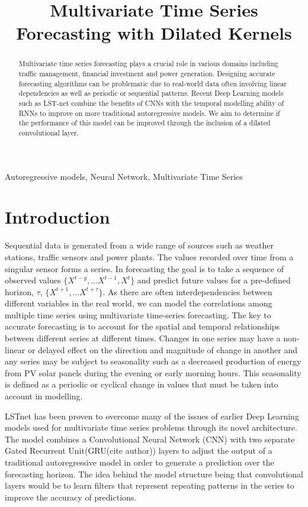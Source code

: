 \documentclass{article}
\title{Multivariate Time Series Forecasting with Dilated Kernels}
\begin{document}
%
\maketitle
%
\begin{abstract}
Multivariate time series forecasting plays a crucial role in various domains including traffic management, financial investment and power generation. Designing accurate forecasting algorithms can be problematic due to real-world data often involving linear dependencies as well as periodic or sequential patterns. Recent Deep Learning models such as LST-net combine the benefits of CNNs with the temporal modelling ability of RNNs to improve on more traditional autoregressive models. We aim to determine if the performance of this model can be improved through the inclusion of a dilated convolutional layer.
\end{abstract}
%
\begin{keywords}
Autoregressive models, Neural Network, Multivariate Time Series
\end{keywords}
%
\section{Introduction}

Sequential data is generated from a wide range of sources such as weather stations, traffic sensors and power plants. The values recorded over time from a singular sensor forms a series. In forecasting the goal is to take a sequence of observed values $\{X^{t-y},...X^{t-1}, X^{t}\}$ and predict future values for a pre-defined horizon, $\tau$,  $\{X^{t+1},...X^{t+\tau}\}$. As there are often interdependencies between different variables in the real world, we can model the correlations among multiple time series using multivariate time-series forecasting. The key to accurate forecasting is to account for the spatial and temporal relationships between different series at different times. Changes in one series may have a non-linear or delayed effect on the direction and magnitude of change in another and any series may be subject to seasonality such as a decreased production of energy from PV solar panels during the evening or early morning hours. This seasonality is defined as a periodic or cyclical change in values that must be taken into account in modelling. 

LSTnet\cite{lai2018modeling} has been proven to overcome many of the issues of earlier Deep Learning models used for multivariate time series problems through its novel architecture. The model combines a Convolutional Neural Network (CNN) with two separate Gated Recurrent Unit(GRU(cite author)) layers to adjust the output of a traditional autoregressive model in order to generate a prediction over the forecasting horizon. The idea behind the model structure being that convolutional layers would be to learn filters that represent repeating patterns in the series to improve the accuracy of predictions.
\end{document}
